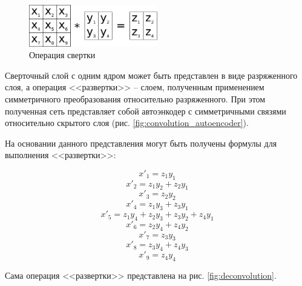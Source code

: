 \begin{figure}[H]
  \centering
  \includegraphics[width=0.5\textwidth]{man-source/images/ch2/pic2-4.png}
  \caption{Операция свертки}
  \label{fig:convolution}
\end{figure}

Сверточный слой с одним ядром может быть представлен в виде разряженного слоя, а операция <<развертки>> -- слоем, полученным применением симметричного преобразования относительно разряженного. При этом полученная сеть представляет собой автоэнкодер с симметричными связями относительно скрытого слоя (рис. \ref{fig:convolution_autoencoder}).

На основании данного представления могут быть получены формулы для выполнения <<развертки>>:

\begin{equation*}
	x'_1 = z_1y_1		
	\end{equation*}
	\begin{equation*}
	x'_2 = z_1y_2+z_2y_1
	\end{equation*}
	\begin{equation*}
	x'_3 = z_2y_2
	\end{equation*}
	\begin{equation*}
	x'_4 = z_1y_3 + z_3y_1
	\end{equation*}
	\begin{equation*}
	x'_5 = z_1y_4 + z_2y_3 + z_3y_2 + z_4y_1
	\end{equation*}
	\begin{equation*}
	x'_6 = z_2y_4 + z_4y_2
	\end{equation*}
	\begin{equation*}
	x'_7 = z_3y_3
	\end{equation*}
	\begin{equation*}
	x'_8 = z_3y_4 + z_4y_3
	\end{equation*}		
	\begin{equation*}
	x'_9 = z_4y_4
	\end{equation*}	

Сама операция <<развертки>> представлена на рис. \ref{fig:deconvolution}.

